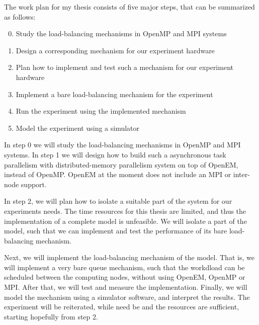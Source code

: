 The work plan for my thesis consists of five major steps, that can be summarized as follows:

\begin{enumerate}
\setcounter{enumi}{-1}
\item Study the load-balancing mechanisms in OpenMP and MPI systems
\item Design a corresponding mechanism for our experiment hardware
\item Plan how to implement and test such a mechanism for our experiment hardware
\item Implement a bare load-balancing mechanism for the experiment
\item Run the experiment using the implemented mechanism
\item Model the experiment using a simulator
\end{enumerate}

In step 0 we will study the load-balancing mechanisms in OpenMP and MPI systems. In step 1 we will design how to build such a asynchronous task parallelism with distributed-memory parallelism system on top of OpenEM, instead of OpenMP. OpenEM at the moment does not include an MPI or inter-node support.

In step 2, we will plan how to isolate a suitable part of the system for our experiments needs. The time resources for this thesis are limited, and thus the implementation of a complete model is unfeasible. We will isolate a part of the model, such that we can implement and test the performance of its bare load-balancing mechanism.

Next, we will implement the load-balancing mechanism of the model. That is, we will implement a very bare queue mechanism, such that the workdload can be scheduled between the computing nodes, without using OpenEM, OpenMP or MPI. After that, we will test and measure the implementation. Finally, we will model the mechanism using a simulator software, and interpret the results. The experiment will be reiterated, while need be and the resources are sufficient, starting hopefully from step 2.

